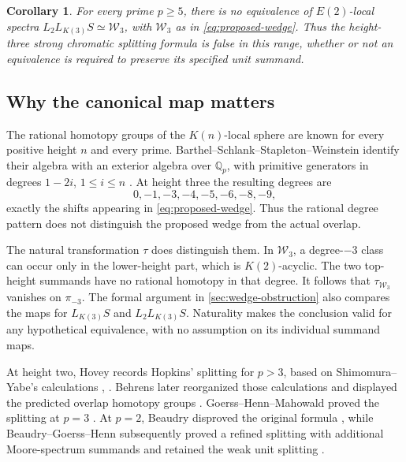 \documentclass[11pt]{article}
\numberwithin{equation}{section}
\newtheorem{corollary}[theorem]{Corollary}
\theoremstyle{definition}
\theoremstyle{remark}
\begin{document}
\begin{corollary}\label{cor:strong}
For every prime \(p\geq5\), there is no equivalence of \(E(2)\)-local
spectra \(L_2L_{K(3)}S\simeq\mathcal W_3\), with \(\mathcal W_3\) as in
\eqref{eq:proposed-wedge}. Thus the height-three strong chromatic
splitting formula is false in this range, whether or not an equivalence
is required to preserve its specified unit summand.
\end{corollary}

\subsection{Why the canonical map matters}

The rational homotopy groups of the \(K(n)\)-local sphere are known
for every positive height \(n\) and every prime. Barthel--Schlank--Stapleton--Weinstein
identify their algebra with an exterior algebra over \(\mathbb Q_p\), with
primitive generators in degrees \(1-2i\), \(1\leq i\leq n\)
\cite[Theorem~A]{BSSW2025}. At height three the resulting degrees are
\[
 0,-1,-3,-4,-5,-6,-8,-9,
\]
exactly the shifts appearing in \eqref{eq:proposed-wedge}. Thus the
rational degree pattern does not distinguish the proposed wedge from
the actual overlap.

The natural transformation \(\tau\) does distinguish them. In
\(\mathcal W_3\), a degree-\(-3\) class can occur only in the
lower-height part, which is \(K(2)\)-acyclic. The two top-height
summands have no rational homotopy in that degree. It follows that
\(\tau_{\mathcal W_3}\) vanishes on \(\pi_{-3}\). The formal argument
in \cref{sec:wedge-obstruction} also compares the maps for
\(L_{K(3)}S\) and \(L_2L_{K(3)}S\). Naturality makes the conclusion
valid for any hypothetical equivalence, with no assumption on its
individual summand maps.

At height two, Hovey records Hopkins' splitting
for \(p>3\), based on Shimomura--Yabe's calculations
\cite[\S4]{Hovey1995}, \cite[Theorem~2.4]{ShimomuraYabe1995}. Behrens later reorganized those calculations
and displayed the predicted overlap homotopy groups
\cite[Remark~7.8]{Behrens2012}. Goerss--Henn--Mahowald proved the
splitting at \(p=3\) \cite[Theorem~5.11]{GHM2014}. At \(p=2\),
Beaudry disproved the original formula \cite[Theorem~1.4]{Beaudry2017},
while Beaudry--Goerss--Henn subsequently proved a refined splitting
with additional Moore-spectrum summands and retained the weak unit
splitting \cite[Theorem~1.1.6]{BGH2022}.
\end{document}
